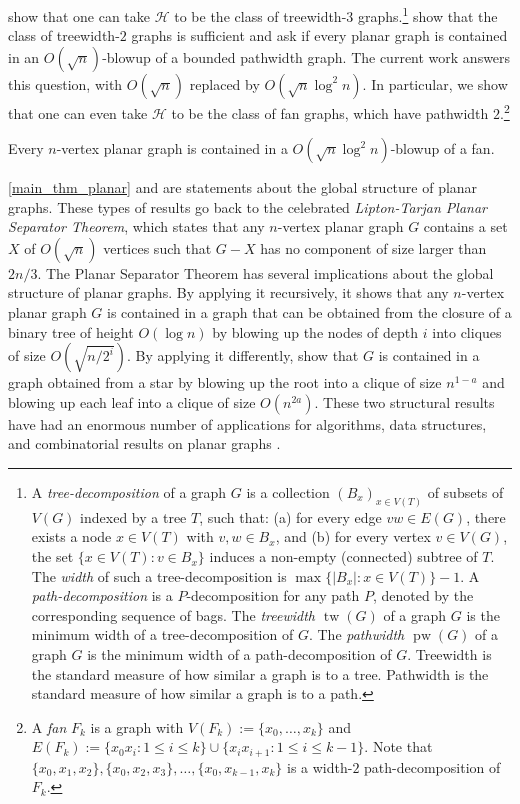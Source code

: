 \documentclass{patmorin}
\renewcommand{\leq}{\leqslant}
\newcommand{\defin}[1]{\emph{\textcolor{brightmaroon}{#1}}}
\DeclareMathOperator{\tw}{tw}
\DeclareMathOperator{\pw}{pw}
\begin{document}
\citet{ISW} show that one can take $\mathcal{H}$ to be the class of treewidth-$3$ graphs.\footnote{A \defin{tree-decomposition} of a graph $G$ is a collection $(B_x)_{x \in V(T)}$ of subsets of $V(G)$ indexed by a tree $T$, such that: (a) for every edge ${vw \in E(G)}$, there exists a node ${x \in V(T)}$ with ${v,w \in B_x}$, and (b) for every vertex ${v \in V(G)}$, the set $\{ x \in V(T) \colon v \in B_x \}$ induces a non-empty (connected) subtree of $T$. The \defin{width} of such a tree-decomposition is ${\max\{ |B_x| \colon x \in V(T) \}-1}$. A \defin{path-decomposition} is a $P$-decomposition for any path $P$, denoted by the corresponding sequence of bags.
The \defin{treewidth $\tw(G)$} of a graph $G$ is the minimum width of a tree-decomposition of $G$.
The \defin{pathwidth $\pw(G)$} of a graph $G$ is the minimum width of a path-decomposition of $G$.
Treewidth is the standard measure of how similar a graph is to a tree.
Pathwidth is the standard measure of how similar a graph is to a path.} \citet{distel.dujmovic.ea:product} show that the class of treewidth-$2$ graphs is sufficient and ask if every planar graph is contained in an $O(\sqrt{n})$-blowup of a bounded pathwidth graph. The current work answers this question, with $O(\sqrt{n})$ replaced by $O(\sqrt{n}\log^2 n)$.  In particular, we show that one can even take $\mathcal{H}$ to be the class of fan graphs, which have pathwidth $2$.\footnote{A \defin{fan} $F_k$ is a graph with $V(F_k):=\{x_0,\ldots,x_k\}$ and $E(F_k):=\{x_0x_i:1\leq i\leq k\}\cup\{x_ix_{i+1}:1\leq i\leq k-1\}$. Note that $\{x_0,x_1,x_2\},\{x_0,x_2,x_3\},\dots,\{x_0,x_{k-1},x_k\}$ is a width-$2$ path-decomposition of $F_k$.}

\begin{thm}\label{main_thm_planar}
  Every $n$-vertex planar graph is contained in a $O(\sqrt{n}\log^2 n)$-blowup of a fan.
\end{thm}

\cref{main_thm_planar} and \citep{ISW,distel.dujmovic.ea:product} are statements about the global structure of planar graphs.  These types of results go back to the celebrated \defin{Lipton-Tarjan Planar Separator Theorem}, which states that any $n$-vertex planar graph $G$ contains a set $X$ of $O(\sqrt{n})$ vertices such that $G-X$ has no component of size larger than $2n/3$. The Planar Separator Theorem has several implications about the global structure of planar graphs.  By applying it recursively, it shows that any $n$-vertex planar graph $G$ is contained in a graph that can be obtained from the closure of a binary tree of height $O(\log n)$ by blowing up the nodes of depth $i$ into cliques of size $O(\sqrt{n/2^i})$.  By applying it differently, \citet{lipton.tarjan:applications} show that $G$ is contained in a graph obtained from a star by blowing up the root into a clique of size $n^{1-a}$ and blowing up each leaf into a clique of size $O(n^{2a})$. These two structural results have had an enormous number of applications for algorithms, data structures, and combinatorial results on planar graphs \cite{references}.
\end{document}
